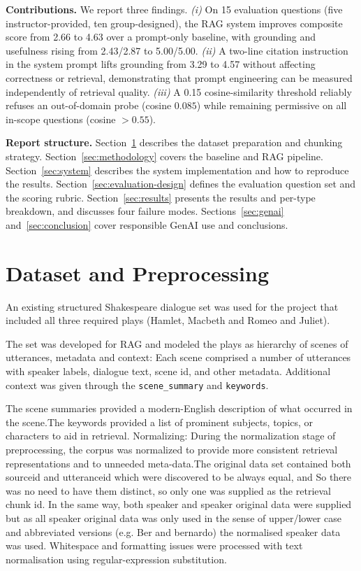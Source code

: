 \documentclass[10pt,conference]{IEEEtran}
\begin{document}
\textbf{Contributions.} We report three findings.
\textit{(i)} On 15 evaluation questions (five instructor-provided,
ten group-designed), the RAG system improves composite score from
2.66 to 4.63 over a prompt-only baseline, with grounding and
usefulness rising from 2.43/2.87 to 5.00/5.00.
\textit{(ii)} A two-line citation instruction in the system prompt
lifts grounding from 3.29 to 4.57 without affecting correctness or
retrieval, demonstrating that prompt engineering can be measured
independently of retrieval quality.
\textit{(iii)} A 0.15 cosine-similarity threshold reliably refuses an
out-of-domain probe (cosine $0.085$) while remaining permissive on
all in-scope questions (cosine $> 0.55$).

\textbf{Report structure.} Section~\ref{sec:dataset} describes the
dataset preparation and chunking strategy. Section~\ref{sec:methodology}
covers the baseline and RAG pipeline.
Section~\ref{sec:system} describes the system implementation and
how to reproduce the results. Section~\ref{sec:evaluation-design}
defines the evaluation question set and the scoring rubric.
Section~\ref{sec:results} presents the results and per-type
breakdown, and discusses four failure modes. Sections~\ref{sec:genai}
and~\ref{sec:conclusion} cover responsible GenAI use and conclusions.

\section{Dataset and Preprocessing}
\label{sec:dataset}

An existing structured Shakespeare dialogue set was used for the project that included all three required plays (Hamlet, Macbeth and Romeo and Juliet).

The set was developed for RAG and modeled the plays as hierarchy of scenes of utterances, metadata and context: Each scene comprised a number of utterances with speaker labels, dialogue text, scene id, and other metadata. Additional context was given through the \texttt{scene\_summary} and \texttt{keywords}.

The scene summaries provided a modern-English description of what occurred in the scene.The keywords provided a list of prominent subjects, topics, or characters to aid in retrieval. Normalizing: During the normalization stage of preprocessing, the corpus was normalized to provide more consistent retrieval representations and to unneeded meta-data.The original data set contained both sourceid and utteranceid which were discovered to be always equal, and So there was no need to have them distinct, so only one was supplied as the retrieval chunk id. In the same way, both speaker and speaker original data were supplied but as all speaker original data was only used in the sense of upper/lower case and abbreviated versions (e.g. Ber and bernardo) the normalised speaker data was used. Whitespace and formatting issues were processed with text normalisation using regular-expression substitution.
\end{document}
